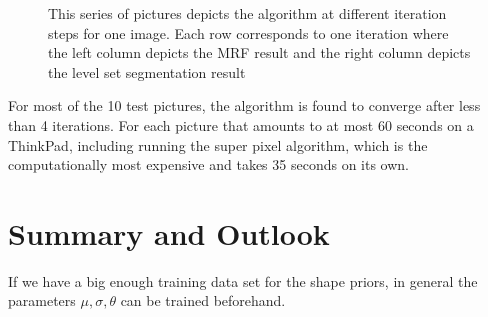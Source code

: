 \documentclass{article} %
\begin{document}
\begin{figure}[htbp]
{}
\caption{This series of pictures depicts the algorithm at different iteration steps for one image. Each row corresponds to one iteration where the left column depicts the MRF result and the right column depicts the level set segmentation result}
\label{Iterations}
\end{figure}

For most of the 10 test pictures, the algorithm is found to converge after less than 4 iterations. For each picture that amounts to at most 60 seconds on a ThinkPad, including running the super pixel algorithm, which is the computationally most expensive and takes 35 seconds on its own.


\section{Summary and Outlook}
If we have a big enough training data set for the shape priors, in general the parameters $\mu, \sigma, \theta$ can be trained beforehand.
\end{document}
